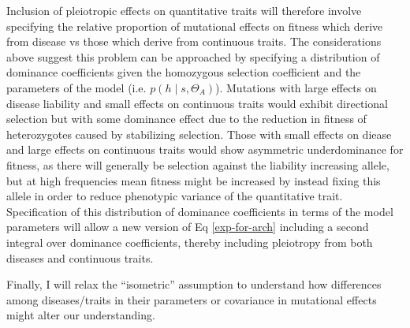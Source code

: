\message{ !name(ResearchStrategy.tex)}\documentclass[11pt]{article}
\begin{document}
Inclusion of pleiotropic effects on quantitative traits will therefore involve specifying the relative proportion of mutational effects on fitness which derive from disease vs those which derive from continuous traits. The considerations above suggest this problem can be approached by specifying a distribution of dominance coefficients given the homozygous selection coefficient and the parameters of the model (i.e. $p\left(h \mid s , \Theta_A\right)$). Mutations with large effects on disease liability and small effects on continuous traits would exhibit directional selection but with some dominance effect due to the reduction in fitness of heterozygotes caused by stabilizing selection. Those with small effects on diease and large effects on continuous traits would show asymmetric underdominance for fitness, as there will generally be selection against the liability increasing allele, but at high frequencies mean fitness might be increased by instead fixing this allele in order to reduce phenotypic variance of the quantitative trait. Specification of this distribution of dominance coefficients in terms of the model parameters will allow a new version of Eq \eqref{exp-for-arch} including a second integral over dominance coefficients, thereby including pleiotropy from both diseases and continuous traits.

Finally, I will relax the ``isometric'' assumption to understand how differences among diseases/traits in their parameters or covariance in mutational effects might alter our understanding.  



\end{document}
